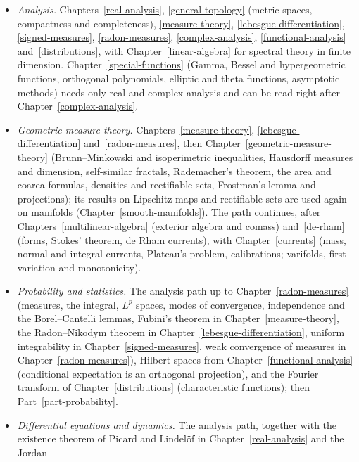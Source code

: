 \begin{itemize}
\ref{singular-homology} and~\ref{poincare-duality}, then Chapter~\ref{low-dimensional-topology} (surfaces and mapping class groups, knots and their polynomials, braids,
three-manifolds); the survey of four-manifolds there mentions intersection forms and gauge theory informally.
\item \emph{Analysis.} Chapters~\ref{real-analysis}, \ref{general-topology} (metric spaces, compactness and completeness), \ref{measure-theory}, \ref{lebesgue-differentiation},
\ref{signed-measures}, \ref{radon-measures}, \ref{complex-analysis}, \ref{functional-analysis} and~\ref{distributions}, with Chapter~\ref{linear-algebra} for spectral theory in finite dimension.
Chapter~\ref{special-functions} (Gamma, Bessel and hypergeometric functions, orthogonal polynomials, elliptic and theta functions, asymptotic methods) needs only real and complex
analysis and can be read right after Chapter~\ref{complex-analysis}.
\item \emph{Geometric measure theory.} Chapters~\ref{measure-theory}, \ref{lebesgue-differentiation} and~\ref{radon-measures}, then Chapter~\ref{geometric-measure-theory}
(Brunn--Minkowski and isoperimetric inequalities, Hausdorff measures and dimension, self-similar fractals, Rademacher's theorem, the area and coarea formulas, densities and rectifiable
sets, Frostman's lemma and projections); its results on Lipschitz maps and rectifiable sets are used again on manifolds (Chapter~\ref{smooth-manifolds}). The path continues, after
Chapters~\ref{multilinear-algebra} (exterior algebra and comass) and~\ref{de-rham} (forms, Stokes' theorem, de Rham currents), with Chapter~\ref{currents} (mass, normal and integral currents, Plateau's
problem, calibrations; varifolds, first variation and monotonicity).
\item \emph{Probability and statistics.} The analysis path up to Chapter~\ref{radon-measures} (measures, the integral, $L^p$ spaces, modes of convergence, independence and the
Borel--Cantelli lemmas, Fubini's theorem in Chapter~\ref{measure-theory}, the Radon--Nikodym theorem in Chapter~\ref{lebesgue-differentiation}, uniform integrability in Chapter~\ref{signed-measures}, weak convergence of measures in
Chapter~\ref{radon-measures}), Hilbert spaces from Chapter~\ref{functional-analysis} (conditional
expectation is an orthogonal projection), and the Fourier transform of Chapter~\ref{distributions} (characteristic functions); then Part~\ref{part-probability}.
\item \emph{Differential equations and dynamics.} The analysis path, together with the existence theorem of Picard and Lindel\"of in Chapter~\ref{real-analysis} and the Jordan

\end{itemize}
